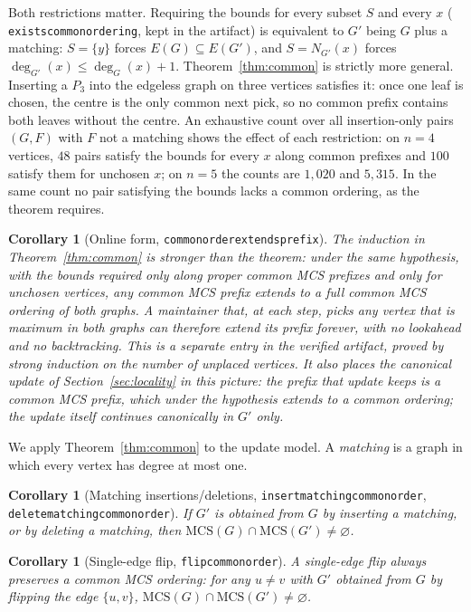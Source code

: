 \documentclass[11pt]{article}
\newtheorem{corollary}[theorem]{Corollary}
\theoremstyle{definition}
\theoremstyle{remark}
\newcommand{\leanname}[1]{%
  \texttt{\begingroup\def\_{\textunderscore\allowbreak}#1\endgroup}}
\newcommand{\mcso}{\mathrm{MCS}}
\begin{document}
Both restrictions matter. Requiring the bounds for every subset $S$ and every
$x$ (\leanname{exists\_common\_ordering}, kept in the artifact) is equivalent to
$G'$ being $G$ plus a matching: $S=\{y\}$ forces $E(G)\subseteq E(G')$, and
$S=N_{G'}(x)$ forces $\deg_{G'}(x)\le\deg_G(x)+1$. Theorem~\ref{thm:common} is
strictly more general. Inserting a $P_3$ into the edgeless graph on three
vertices satisfies it: once one leaf is chosen, the centre is the only common
next pick, so no common prefix contains both leaves without the centre.
An exhaustive count over all insertion-only pairs $(G,F)$ with $F$ not a
matching shows the effect of each restriction: on $n=4$ vertices, $48$ pairs
satisfy the bounds for every $x$ along common prefixes and $100$ satisfy them
for unchosen $x$; on $n=5$ the counts are $1{,}020$ and $5{,}315$. In the same
count no pair satisfying the bounds lacks a common ordering, as the theorem
requires.

\begin{corollary}[Online form, \leanname{common\_order\_extends\_prefix}]
\label{cor:online}
The induction in Theorem~\ref{thm:common} is stronger than the theorem: under
the same hypothesis, with the bounds required only along proper common MCS
prefixes and only for unchosen vertices, any common MCS prefix extends to a full
common MCS ordering of both graphs. A
maintainer that, at each step, picks \emph{any} vertex that is maximum in both
graphs can therefore extend its prefix forever, with no lookahead and no
backtracking. This is a separate entry in the verified artifact, proved by strong
induction on the number of unplaced vertices. It also places the canonical
update of Section~\ref{sec:locality} in this picture: the prefix that update
keeps is a common MCS prefix, which under the hypothesis extends to a common
ordering; the update itself continues canonically in $G'$ only.
\end{corollary}

We apply Theorem~\ref{thm:common} to the update model. A \emph{matching} is a
graph in which every vertex has degree at most one.

\begin{corollary}[Matching insertions/deletions, \leanname{insert\_matching\_common\_order}, \leanname{delete\_matching\_common\_order}]
\label{cor:matching}
If $G'$ is obtained from $G$ by inserting a matching, or by deleting a matching,
then $\mcso(G)\cap\mcso(G')\neq\varnothing$.
\end{corollary}

\begin{corollary}[Single-edge flip, \leanname{flip\_common\_order}]
A single-edge flip always preserves a common MCS ordering: for any $u\neq v$
with $G'$ obtained from $G$ by flipping the edge $\{u,v\}$,
$\mcso(G)\cap\mcso(G')\neq\varnothing$.
\end{corollary}
\end{document}
